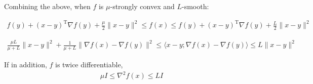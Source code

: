 \documentclass[a4paper,twoside,10pt]{amsart}
\numberwithin{equation}{section} %
\numberwithin{figure}{section} %
\numberwithin{table}{section} %
\theoremstyle{definition}
\begin{document}
\begin{tcolorbox}[width=\textwidth,colback={blue!5!white},title={\textbf{Optimization inequalities cheatsheet}},colbacktitle=black,coltitle=white]
\vspace*{1cm}

Combining the above, when $f$ is $\mu$-strongly convex and $L$-smooth:

\begin{align*}
f(y) +  (x-y)^\mathrm{T} \nabla f(y)  + \frac{\mu}{2} \| x-y\|^2 \leq f(x) \leq f(y) +  (x-y)^\mathrm{T} \nabla f(y)  + \frac{L}{2} \| x-y\|^2
\end{align*}



\begin{align*}
\frac{\mu L}{\mu + L} \|x-y\|^2  +  \frac{1}{\mu  +  L} \|\nabla f(x) - \nabla f(y) \|^2   \leq  \langle x-y  ;  \nabla f(x)-\nabla f(y)\rangle \leq L \|x-y\|^2 
\end{align*}


If in addition, $f$ is twice differentiable,
\begin{align*}
\mu I  \leq  \nabla^2 f(x) \leq L  I  
\end{align*}

\end{tcolorbox}    
\end{document}
